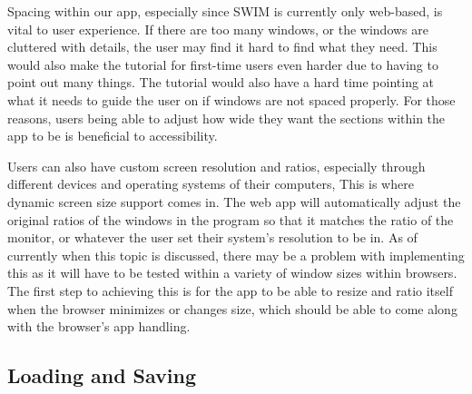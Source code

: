 \documentclass[
    paper=letter,
    parskip=half,
    fontsize=12pt,
    titlepage=firstiscover,
    toc=bibliography,
    numbers=endperiod
]{scrartcl}
\begin{document}
Spacing within our app, especially since SWIM is currently only
web-based, is vital to user experience. If there are too many windows,
or the windows are cluttered with details, the user may find it hard to
find what they need. This would also make the tutorial for first-time
users even harder due to having to point out many things. The tutorial
would also have a hard time pointing at what it needs to guide the user
on if windows are not spaced properly. For those reasons, users being
able to adjust how wide they want the sections within the app to be is
beneficial to accessibility.

Users can also have custom screen resolution and ratios, especially
through different devices and operating systems of their computers, This
is where dynamic screen size support comes in. The web app will
automatically adjust the original ratios of the windows in the program
so that it matches the ratio of the monitor, or whatever the user set
their system's resolution to be in. As of currently when this topic is
discussed, there may be a problem with implementing this as it will have
to be tested within a variety of window sizes within browsers. The first
step to achieving this is for the app to be able to resize and ratio
itself when the browser minimizes or changes size, which should be able
to come along with the browser's app handling.

\subsection{Loading and Saving}
\end{document}
